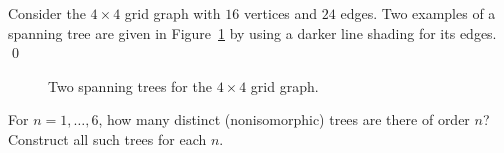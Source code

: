 \begin{example}
\label{eg:trees_forests:spanning_tree}
{\rm
Consider the $4 \times 4$ grid graph with $16$
vertices and $24$ edges. Two examples of a
spanning tree are given in
Figure~\ref{fig:trees_forests:grid_graph_spanning_trees} by using a
darker line shading for its edges.}
\qed
\end{example}

\begin{figure}[!htbp]
\centering
{}
\qquad
{}
\caption{Two spanning trees for the $4 \times 4$ grid graph.}
\label{fig:trees_forests:grid_graph_spanning_trees}
\end{figure}

\begin{example}
For $n = 1, \dots, 6$, how many distinct
(nonisomorphic) trees are there of order
$n$? Construct all such trees for each $n$.
\end{example}

